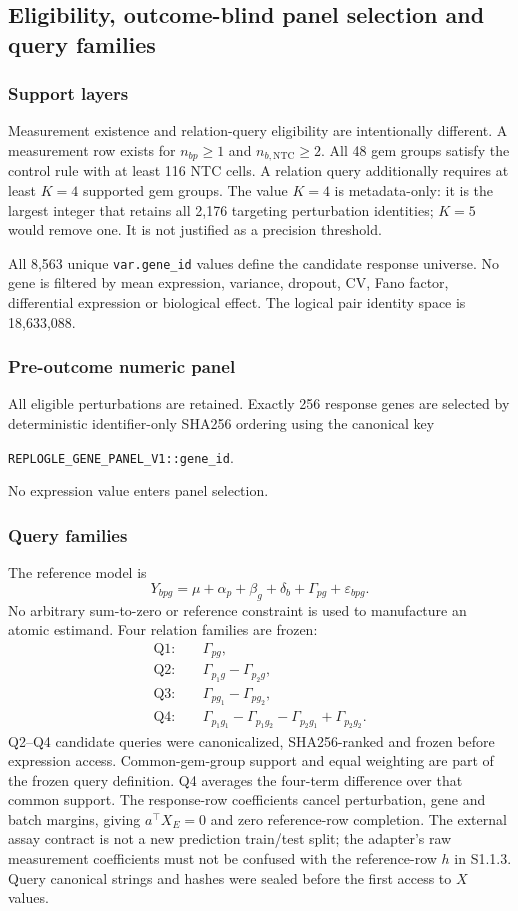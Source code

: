 \documentclass[11pt]{article}
\begin{document}
\subsection{Eligibility, outcome-blind panel selection and query families}
\subsubsection{Support layers}
Measurement existence and relation-query eligibility are intentionally different. A measurement row exists for $n_{bp}\ge1$ and $n_{b,\mathrm{NTC}}\ge2$. All 48 gem groups satisfy the control rule with at least 116 NTC cells. A relation query additionally requires at least $K=4$ supported gem groups. The value $K=4$ is metadata-only: it is the largest integer that retains all 2,176 targeting perturbation identities; $K=5$ would remove one. It is not justified as a precision threshold.

All 8,563 unique \texttt{var.gene\_id} values define the candidate response universe. No gene is filtered by mean expression, variance, dropout, CV, Fano factor, differential expression or biological effect. The logical pair identity space is 18,633,088.

\subsubsection{Pre-outcome numeric panel}
All eligible perturbations are retained. Exactly 256 response genes are selected by deterministic identifier-only SHA256 ordering using the canonical key
\begin{center}
\texttt{REPLOGLE\_GENE\_PANEL\_V1::gene\_id}.
\end{center}
No expression value enters panel selection.

\subsubsection{Query families}
The reference model is
\[
Y_{bpg}=\mu+\alpha_p+\beta_g+\delta_b+\Gamma_{pg}+\varepsilon_{bpg}.
\]
No arbitrary sum-to-zero or reference constraint is used to manufacture an atomic estimand. Four relation families are frozen:
\begin{align*}
\mathrm{Q1}:&\quad \Gamma_{pg},\\
\mathrm{Q2}:&\quad \Gamma_{p_1g}-\Gamma_{p_2g},\\
\mathrm{Q3}:&\quad \Gamma_{pg_1}-\Gamma_{pg_2},\\
\mathrm{Q4}:&\quad \Gamma_{p_1g_1}-\Gamma_{p_1g_2}-\Gamma_{p_2g_1}+\Gamma_{p_2g_2}.
\end{align*}
Q2--Q4 candidate queries were canonicalized, SHA256-ranked and frozen before expression access. Common-gem-group support and equal weighting are part of the frozen query definition. Q4 averages the four-term difference over that common support. The response-row coefficients cancel perturbation, gene and batch margins, giving $a^\top X_E=0$ and zero reference-row completion. The external assay contract is not a new prediction train/test split; the adapter's raw measurement coefficients must not be confused with the reference-row $h$ in S1.1.3. Query canonical strings and hashes were sealed before the first access to $X$ values.
\end{document}
